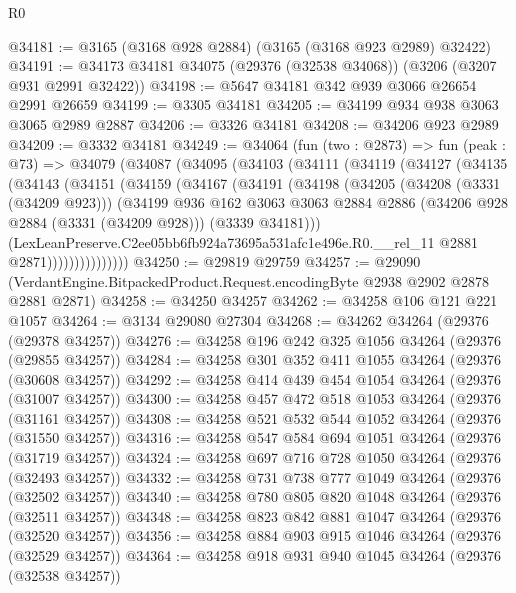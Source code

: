 \begin{lexlean}{R0}
\begin{coremodule}
@34181 := @3165 (@3168 @928 @2884) (@3165 (@3168 @923 @2989) @32422)
@34191 := @34173 @34181 @34075 (@29376 (@32538 @34068)) (@3206 (@3207 @931 @2991 @32422))
@34198 := @5647 @34181 @342 @939 @3066 @26654 @2991 @26659
@34199 := @3305 @34181
@34205 := @34199 @934 @938 @3063 @3065 @2989 @2887
@34206 := @3326 @34181
@34208 := @34206 @923 @2989
@34209 := @3332 @34181
@34249 := @34064
    (fun (two : @2873) =>
    fun (peak : @73) =>
    @34079
      (@34087
        (@34095
          (@34103
            (@34111
              (@34119
                (@34127
                  (@34135
                    (@34143
                      (@34151
                        (@34159
                          (@34167
                            (@34191
                              (@34198
                                (@34205
                                  (@34208 (@3331 (@34209 @923)))
                                  (@34199
                                    @936
                                    @162
                                    @3063
                                    @3063
                                    @2884
                                    @2886
                                    (@34206 @928 @2884 (@3331 (@34209 @928)))
                                    (@3339 @34181)))
                                (LexLeanPreserve.C2ee05bb6fb924a73695a531afc1e496e.R0.__rel_11
                                  @2881
                                  @2871)))))))))))))))
@34250 := @29819 @29759
@34257 := @29090 (VerdantEngine.BitpackedProduct.Request.encodingByte @2938 @2902 @2878 @2881 @2871)
@34258 := @34250 @34257
@34262 := @34258 @106 @121 @221 @1057
@34264 := @3134 @29080 @27304
@34268 := @34262 @34264 (@29376 (@29378 @34257))
@34276 := @34258 @196 @242 @325 @1056 @34264 (@29376 (@29855 @34257))
@34284 := @34258 @301 @352 @411 @1055 @34264 (@29376 (@30608 @34257))
@34292 := @34258 @414 @439 @454 @1054 @34264 (@29376 (@31007 @34257))
@34300 := @34258 @457 @472 @518 @1053 @34264 (@29376 (@31161 @34257))
@34308 := @34258 @521 @532 @544 @1052 @34264 (@29376 (@31550 @34257))
@34316 := @34258 @547 @584 @694 @1051 @34264 (@29376 (@31719 @34257))
@34324 := @34258 @697 @716 @728 @1050 @34264 (@29376 (@32493 @34257))
@34332 := @34258 @731 @738 @777 @1049 @34264 (@29376 (@32502 @34257))
@34340 := @34258 @780 @805 @820 @1048 @34264 (@29376 (@32511 @34257))
@34348 := @34258 @823 @842 @881 @1047 @34264 (@29376 (@32520 @34257))
@34356 := @34258 @884 @903 @915 @1046 @34264 (@29376 (@32529 @34257))
@34364 := @34258 @918 @931 @940 @1045 @34264 (@29376 (@32538 @34257))

\end{coremodule}
\end{lexlean}
